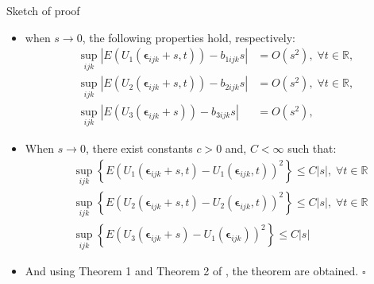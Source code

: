 \documentclass[t,9pt]{beamer}
\begin{document}
\begin{frame}[fragile]{Sketch of proof}
\begin{itemize}
    \item[3.] when $s\to 0 $, the following properties hold, respectively:
\begin{align}
    \sup_{ijk}\left| E(U_1(\pmb{\epsilon}_{ijk}+s, t))-b_{1ijk}s\right|&=O(s^2), \; \forall t\in \mathbb{R},\nonumber \\
     \sup_{ijk}\left| E(U_2(\pmb{\epsilon}_{ijk}+s, t))-b_{2ijk}s\right|&=O(s^2), \; \forall t\in \mathbb{R},\nonumber \\
     \sup_{ijk}\left| E(U_3(\pmb{\epsilon}_{ijk}+s))-b_{3ijk}s\right|&=O(s^2)\nonumber,
\end{align}
\item[4.] When $s\to 0$, there exist constants $c>0$ and,  $C<\infty$ such that:
\begin{align}
    & \sup_{ijk}\left\{ E(U_1(\pmb{\epsilon}_{ijk}+s, t)-U_1(\pmb{\epsilon}_{ijk}, t))^2\right\} \leq C|s|, \; \forall t\in \mathbb{R}\nonumber\\
     &\sup_{ijk}\left\{ E(U_2(\pmb{\epsilon}_{ijk}+s, t)-U_2(\pmb{\epsilon}_{ijk}, t))^2\right\} \leq C|s|, \; \forall t\in \mathbb{R}\nonumber\\
     &\sup_{ijk}\left\{ E(U_3(\pmb{\epsilon}_{ijk}+s)-U_1(\pmb{\epsilon}_{ijk}))^2\right\} \leq C|s|\nonumber
\end{align}
\item[4.] And using Theorem 1 and Theorem 2 of \cite{he2002estimation}, the theorem are obtained. $\square$
\end{itemize}
\end{frame}
\end{document}
